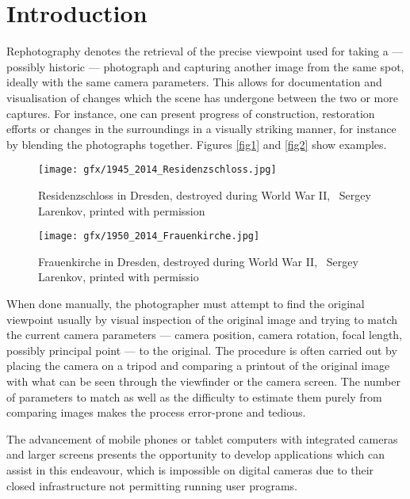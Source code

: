 \chapter{Introduction}
Rephotography denotes the retrieval of the precise viewpoint used for taking a
--- possibly historic --- photograph and capturing another image from the same
spot, ideally with the same camera parameters. This allows for
documentation and visualisation of changes which the scene has undergone between
the two or more captures.  For instance, one can present progress of
construction, restoration efforts or changes in the surroundings in a visually
striking manner, for instance by blending the photographs together. 
Figures \autoref{fig1} and \autoref{fig2} show examples.

\begin{figure}
   \texttt{[image: gfx/1945\_2014\_Residenzschloss.jpg]}
   \caption{Residenzschloss in Dresden, destroyed during World War II,
   \textcopyright\ Sergey Larenkov, printed with permission}
   \label{fig1}
\end{figure}

\begin{figure}
   \texttt{[image: gfx/1950\_2014\_Frauenkirche.jpg]}
   \caption{Frauenkirche in Dresden, destroyed during World War II,
   \textcopyright\ Sergey Larenkov, printed with permissio}
   \label{fig2}
\end{figure}

When done manually, the photographer must attempt to find the original viewpoint 
usually by visual inspection of the original image and trying to match the
current camera parameters --- camera position, camera rotation, focal length,
possibly principal point --- to the original.
The procedure is often carried out by placing the camera on a tripod and
comparing a printout of the original image with what can be seen through the
viewfinder or the camera screen. The number of parameters to match as well as
the difficulty to estimate them purely from comparing images makes the process
error-prone and tedious.

The advancement of mobile phones or tablet computers with integrated cameras and
larger screens
presents the opportunity to develop applications which can assist in this
endeavour, which is impossible on digital cameras due to their closed
infrastructure not permitting running user programs.
